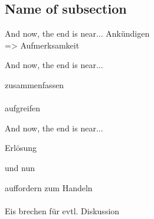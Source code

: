 {\Huge

\subsection{Name of subsection}
\begin{frame}{And now, the end is near...}
\pause
{\center Ankündigen\\}
\pause
\hfill {\small=> Aufmerksamkeit}

\end{frame}


\begin{frame}{And now, the end is near...}
\pause

\begin{center}{ 

zusammenfassen\\
\ \\\pause
  aufgreifen

}\end{center}

\end{frame}


\begin{frame}{And now, the end is near...}
\begin{center}
Erlösung
\end{center}
\end{frame}


\begin{frame}{und nun}
\pause
\begin{center}
auffordern zum Handeln\pause
\\\ \\
Eis brechen für evtl. Diskussion
\end{center}

\end{frame}

}
